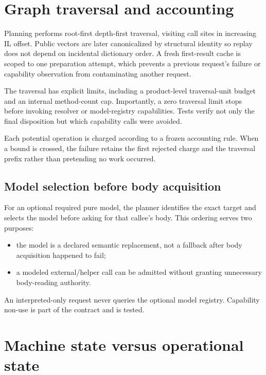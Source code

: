 \documentclass[11pt,oneside,openany]{book}
\begin{document}
\section{Graph traversal and accounting}

Planning performs root-first depth-first traversal, visiting call sites in increasing IL offset. Public vectors are later canonicalized by structural identity so replay does not depend on incidental dictionary order. A fresh first-result cache is scoped to one preparation attempt, which prevents a previous request's failure or capability observation from contaminating another request.

The traversal has explicit limits, including a product-level traversal-unit budget and an internal method-count cap. Importantly, a zero traversal limit stops before invoking resolver or model-registry capabilities. Tests verify not only the final disposition but which capability calls were avoided.

Each potential operation is charged according to a frozen accounting rule. When a bound is crossed, the failure retains the first rejected charge and the traversal prefix rather than pretending no work occurred.

\subsection{Model selection before body acquisition}

For an optional required pure model, the planner identifies the exact target and selects the model before asking for that callee's body. This ordering serves two purposes:

\begin{itemize}
  \item the model is a declared semantic replacement, not a fallback after body acquisition happened to fail;
  \item a modeled external/helper call can be admitted without granting unnecessary body-reading authority.
\end{itemize}

An interpreted-only request never queries the optional model registry. Capability non-use is part of the contract and is tested.

\section{Machine state versus operational state}
\end{document}
